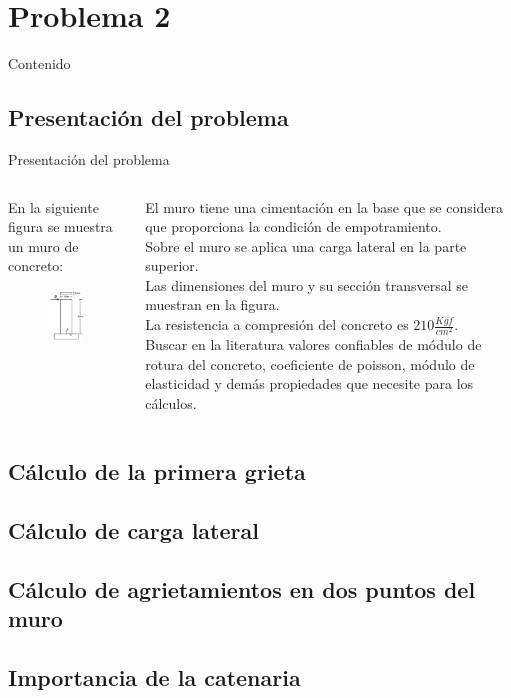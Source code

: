 \section{Problema 2}
\begin{frame}{Contenido}
        \tableofcontents[sections={3}]
\end{frame}
\subsection{Presentación del problema}
\begin{frame}{Presentación del problema}
    \begin{columns}
        \begin{column}{0.47\textwidth}
            En la siguiente figura se muestra un muro de concreto:
            \begin{figure}[h]
                \includegraphics[width=3cm]{Imagenes/MuroEmpot.png}
                \centering
            \end{figure}
        \end{column}
        \begin{column}{0.47\textwidth}
            \justify
            El muro tiene una cimentación en la base que se considera que proporciona la condición de empotramiento. \\
            Sobre el muro se aplica una carga lateral en la parte superior. \\
            Las dimensiones del muro y su sección transversal se muestran en la figura.\\
            La resistencia a compresión del concreto es $210\frac{Kgf}{cm^{2}}$.\\
            Buscar en la literatura valores confiables de módulo de rotura del concreto, coeficiente de poisson, módulo de elasticidad y demás propiedades que necesite para los cálculos.
        \end{column}
    \end{columns}
             
\end{frame}
\subsection{Cálculo de la primera grieta}
\subsection{Cálculo de carga lateral}
\subsection{Cálculo de agrietamientos en dos puntos del muro}
\subsection{Importancia de la catenaria}
